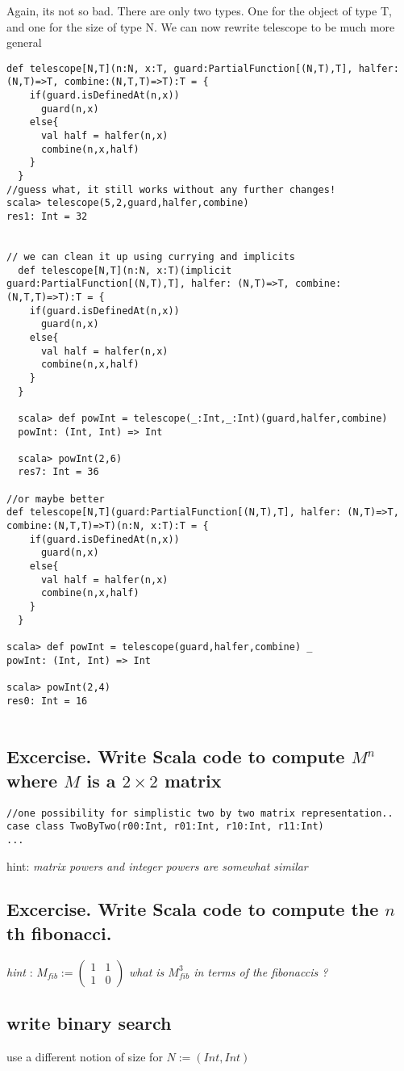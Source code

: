 \documentclass[12pt]{article}
\begin{document}
Again, its not so bad. There are only two types. One for the object of type T, and one for the size of type N. We can now rewrite telescope to be much more general
\begin{lstlisting}
def telescope[N,T](n:N, x:T, guard:PartialFunction[(N,T),T], halfer: (N,T)=>T, combine:(N,T,T)=>T):T = {
    if(guard.isDefinedAt(n,x))
      guard(n,x)
    else{
      val half = halfer(n,x)
      combine(n,x,half)
    }
  }
//guess what, it still works without any further changes!
scala> telescope(5,2,guard,halfer,combine)
res1: Int = 32


// we can clean it up using currying and implicits
  def telescope[N,T](n:N, x:T)(implicit guard:PartialFunction[(N,T),T], halfer: (N,T)=>T, combine:(N,T,T)=>T):T = {
    if(guard.isDefinedAt(n,x))
      guard(n,x)
    else{
      val half = halfer(n,x)
      combine(n,x,half)
    }
  }

  scala> def powInt = telescope(_:Int,_:Int)(guard,halfer,combine)
  powInt: (Int, Int) => Int

  scala> powInt(2,6)
  res7: Int = 36

//or maybe better
def telescope[N,T](guard:PartialFunction[(N,T),T], halfer: (N,T)=>T, combine:(N,T,T)=>T)(n:N, x:T):T = {
    if(guard.isDefinedAt(n,x))
      guard(n,x)
    else{
      val half = halfer(n,x)
      combine(n,x,half)
    }
  }

scala> def powInt = telescope(guard,halfer,combine) _
powInt: (Int, Int) => Int

scala> powInt(2,4)
res0: Int = 16
 
\end{lstlisting}

\subsection{Excercise. Write Scala code to compute $M^{n}$ where $M$ is a $2 \times 2$ matrix}

\begin{lstlisting}
//one possibility for simplistic two by two matrix representation.. 
case class TwoByTwo(r00:Int, r01:Int, r10:Int, r11:Int)
...
\end{lstlisting}

hint: \textit{matrix powers and integer powers are somewhat similar}

\subsection{Excercise. Write Scala code to compute the $n$th fibonacci.}

\textit{hint} : $M_{fib} := \left(\begin{matrix} 1 & 1 \\  1 & 0 \end{matrix} \right)$
\textit{what is $M_{fib}^{3}$ in terms of the fibonaccis ?}


\subsection{write binary search}
use a different notion of size for $N := (Int,Int)$ 
\end{document}
